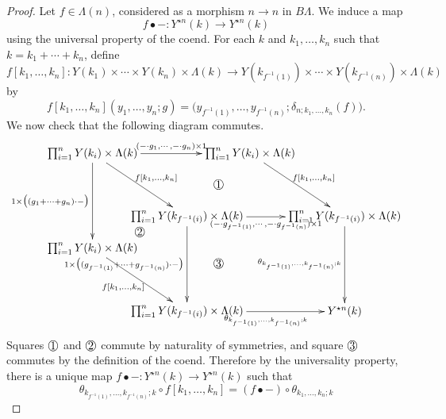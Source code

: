 \begin{proof}
Let $f \in \Lambda(n)$, considered as a morphism $n \rightarrow n$ in $B\Lambda$. We induce a map 
\[
f \bullet - \colon Y^{\star n}(k) \rightarrow Y^{\star n}(k)
\]
using the universal property of the coend. For each $k$ and $k_1, \ldots, k_n$ such that $k = k_1 + \cdots + k_n$, define
\[
f[k_1, \ldots, k_n] \colon Y(k_1) \times \cdots \times Y(k_n) \times \Lambda(k) \to  Y(k_{f^{-1}(1)}) \times \cdots \times Y(k_{f^{-1}(n)}) \times \Lambda(k)
\]
by
\[
f[k_1, \ldots, k_n](y_1, \ldots, y_n; g) = \big( y_{f^{-1}(1)}, \ldots, y_{f^{-1}(n)}; \delta_{n; k_1, \ldots, k_n}(f) \big).
\]
We now check that the following diagram commutes.
  \[
    \xy
      (0,0)*+{\prod_{i=1}^n Y(k_i)  \times \Lambda(k)}="a";
      (50,0)*+{\prod_{i=1}^n Y(k_i) \times \Lambda(k)}="b";
      (80,-20)*+{\prod_{i=1}^n Y(k_{f^{-1}(i)}) \times \Lambda(k)}="c";
      (80,-50)*+{Y^{\star n}(k)}="d";
      (0,-30)*+{\prod_{i=1}^n Y(k_i)  \times \Lambda(k)}="e";
      (30,-50)*+{\prod_{i=1}^n Y(k_{f^{-1}(i)}) \times \Lambda(k)}="f";
      (30,-20)*+{\prod_{i=1}^n Y(k_{f^{-1}(i)}) \times \Lambda(k)}="g";
      (40,-10)*+{\raisebox{.5pt}{\textcircled{\raisebox{-.9pt} {1}}}}="1";
      (15,-25)*+{\raisebox{.5pt}{\textcircled{\raisebox{-.9pt} {2}}}}="2";
      (40,-35)*+{\raisebox{.5pt}{\textcircled{\raisebox{-.9pt} {3}}}}="3";
      {\ar^{(-\cdot g_1, \cdots, -\cdot g_n) \times 1} "a" ; "b"};
      {\ar^{f[k_1, \ldots, k_n]} "b" ; "c"};
      {\ar_{\theta_{k_{f^{-1}(1)}, \ldots, k_{f^{-1}(n)}; k}} "c" ; "d"};
      {\ar_{1 \times \big( (g_1 + \cdots + g_n)\cdot -\big)} "a" ; "e"};
      {\ar_{f[k_1, \ldots, k_n]} "e" ; "f"};
      {\ar_{\theta_{k_{f^{-1}(1)}, \ldots, k_{f^{-1}(n)}; k}} "f" ; "d"};
      {\ar^{f[k_1, \ldots, k_n]} "a" ; "g"};
      {\ar_{1 \times \big( (g_{f^{-1}(1)} + \cdots + g_{f^{-1}(n)})\cdot -\big)} "g" ; "f"};
      {\ar_{(-\cdot g_{f^{-1}(1)}, \cdots, -\cdot g_{f^{-1}(n)}) \times 1} "g" ; "c"};
    \endxy
  \]
Squares $\raisebox{.5pt}{\textcircled{\raisebox{-.9pt} {1}}}$ and $\raisebox{.5pt}{\textcircled{\raisebox{-.9pt} {2}}}$ commute by naturality of symmetries, and square $\raisebox{.5pt}{\textcircled{\raisebox{-.9pt} {3}}}$ commutes by the definition of the coend. 
Therefore by the universality property, there is a unique map $f \bullet - \colon Y^{\star n}(k) \rightarrow Y^{\star n}(k)$ such that
\begin{equation}\label{eq:fbullet}
\theta_{k_{f^{-1}(1)}, \ldots, k_{f^{-1}(n)}; k} \circ f[k_1, \ldots, k_n] = (f \bullet -) \circ \theta_{k_1, \ldots, k_n; k}

\end{equation}
\end{proof}
